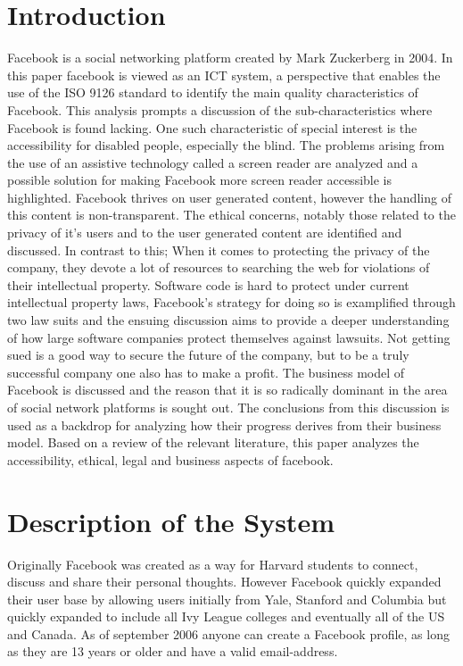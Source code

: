 \documentclass[conference]{IEEEtran}
\begin{document}
\section{Introduction}
Facebook is a social networking platform created by Mark Zuckerberg in 2004.
In this paper facebook is viewed as an ICT system, a perspective that enables
the use of the ISO 9126 standard to identify the main quality characteristics of Facebook. 
This analysis prompts a discussion of the sub-characteristics where Facebook is found
lacking. One such characteristic of special interest is the accessibility for
disabled people, especially the blind. The problems arising from the use of an
assistive technology called a screen reader are analyzed and a possible
solution for making Facebook more screen reader accessible is highlighted.
Facebook thrives on user generated content, however the handling of this
content is non-transparent. The ethical concerns, notably those related to the
privacy of it's users and to the user generated content are identified and
discussed. In contrast to this; When it comes to protecting the privacy of the
company, they devote a lot of resources to searching the web for violations of
their intellectual property.  Software code is hard to protect under current
intellectual property laws, Facebook's strategy for doing so is examplified
through two law suits and the ensuing discussion aims to provide a deeper
understanding of how large software companies protect themselves against
lawsuits. Not getting sued is a good way to secure the future of the company,
but to be a truly successful company one also has to make a profit. The
business model of Facebook is discussed and the reason that it is so radically
dominant in the area of social network platforms is sought out. The conclusions
from this discussion is used as a backdrop for analyzing how their progress
derives from their business model. Based on a review of the relevant
literature, this paper analyzes the accessibility, ethical, legal and business
aspects of facebook. 

\section{Description of the System}
\label{system}

Originally Facebook was created as a way for Harvard students to connect, discuss and share their personal thoughts. However Facebook quickly expanded their user base by allowing users initially from Yale, Stanford and Columbia but quickly expanded to include all Ivy League colleges and eventually all of the US and Canada.\cite{FacebookHistoryWiki2014} As of september 2006 anyone can create a Facebook profile, as long as they are 13 years or older and have a valid email-address. \cite{JohnStrickland2007}
\end{document}
